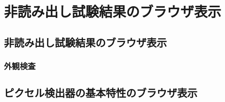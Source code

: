 \chapter{非読み出し試験結果のブラウザ表示}
\label{sec:A}

\section{非読み出し試験結果のブラウザ表示}
\label{sec:A1}

\subsection{外観検査}
\label{sec:A11}


\section{ピクセル検出器の基本特性のブラウザ表示}
\label{sec:A2}
